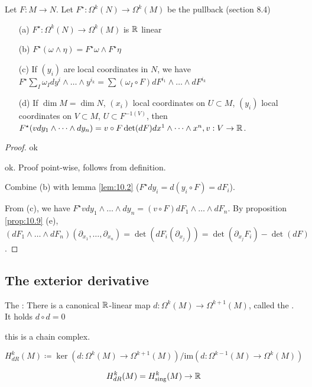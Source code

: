 \begin{lemma}\label{lem:1.10}
    Let \(F:M\to N\). Let \(F^\star:\Omega^k(N)\to\Omega^k(M)\) be the pullback (section 8.4) %
    \begin{enumerate}
        \item[(a)] \(F^\star:\Omega^k(N)\to\Omega^k(M)\) is \(\mathbb{R}\) linear 
        \item[(b)] \(F^\star(\omega\wedge \eta)=F^\star \omega\wedge F^\star \eta \)
        \item[(c)] If \((y_i)\) are local coordinates in \(N\), we have \(F^\star\sum_I \omega_I dy^i\wedge\dots\wedge y^{i_k}=\sum (\omega_I\circ F)dF^{i_1}\wedge \dots\wedge dF^{i_k}\)
        \item[(d)] If \(\dim M=\dim N\), \((x_i)\) local coordinates on \(U\subset M\), \((y_i)\) local coordinates on \(V\subset M\), \(U\subset F^{-1(V)}\),
                   then \(F^\star(vdy_1\wedge \dots \wedge dy_n)=v\circ F\det (dF)dx^1\wedge \dots \wedge x^n, v:V\to \mathbb{R}\).   
    \end{enumerate}
\end{lemma}

\begin{proof}
     ok

     ok. Proof point-wise, follows from definition.

     Combine (b) with lemma \ref{lem:10.2} (\(F^\star dy_i=d(y_i\circ F)=dF_i\)).

     From (c), we have \(F^\star vdy_1\wedge\dots\wedge dy_n=(v\circ F)dF_1\wedge \dots\wedge dF_n\).
    By proposition \ref{prop:10.9} (e), \((dF_1\wedge\dots\wedge dF_n)(\partial_{x_1},\dots,\partial_{x_n})=\det(dF_i(\partial_{x_j}))=\det(\partial_{x_j}F_i)-\det(dF)\).

\end{proof}

\subsection{The exterior derivative}

The : There is a canonical \(\mathbb{R}\)-linear map \(d:\Omega^k(M)\to\Omega^{k+1}(M)\), called 
the . It holds \(d\circ d=0\)
this is a chain complex.

\begin{definition*}
    \(H_{dR}^k(M)\coloneqq \ker(d:\Omega^k(M)\to\Omega^{k+1}(M))/\text{im}(d:\Omega^{k-1}(M)\to\Omega^k(M))\)
\end{definition*}

\begin{theorem}[deRham]\label{thm:10.11}
    \[H_{dR}^k(M)=H_{\text{sing}}^k(M)\to\mathbb{R}\]
\end{theorem}



